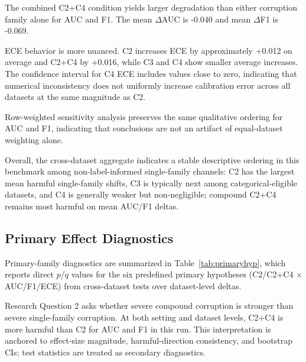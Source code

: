 \documentclass{AuthorGuide/ijitcs}
\newcommand{\fittableinput}[1]{%
\begingroup
\setlength{\tabcolsep}{4pt}%
\resizebox{\textwidth}{!}{}%
\endgroup
}
\begin{document}
The combined C2+C4 condition yields larger degradation than either corruption family alone for AUC and F1. The mean $\Delta$AUC is -0.040 and mean $\Delta$F1 is -0.069.

ECE behavior is more nuanced. C2 increases ECE by approximately +0.012 on average and C2+C4 by +0.016, while C3 and C4 show smaller average increases. The confidence interval for C4 ECE includes values close to zero, indicating that numerical inconsistency does not uniformly increase calibration error across all datasets at the same magnitude as C2.

Row-weighted sensitivity analysis preserves the same qualitative ordering for AUC and F1, indicating that conclusions are not an artifact of equal-dataset weighting alone.

Overall, the cross-dataset aggregate indicates a stable descriptive ordering in this benchmark among non-label-informed single-family channels: C2 has the largest mean harmful single-family shifts, C3 is typically next among categorical-eligible datasets, and C4 is generally weaker but non-negligible; compound C2+C4 remains most harmful on mean AUC/F1 deltas.

\begin{table}[!t]
\caption{Cross-dataset severe effects (0.4 minus 0.0), from \texttt{../results/tables/table\_cross\_dataset\_effects.csv}. Estimand: dataset-unweighted mean of dataset-level severe-minus-baseline deltas, where each dataset-level delta averages over model and encoding settings. Uncertainty: bootstrap 95\% CI over datasets. Eligibility: C1/C2/C4/C2+C4 use all 12 datasets; C3 uses categorical-eligible datasets only (\texttt{n\_cat\_cols > 0}, $n=10$). Harmful direction is $\Delta$AUC/$\Delta$F1 $< 0$ and $\Delta$ECE $> 0$.\label{tab:cross}}
\small
\fittableinput{../results/tables/table_cross_dataset_effects.tex}
\end{table}

\subsection{Primary Effect Diagnostics}
Primary-family diagnostics are summarized in Table~\ref{tab:primaryhyp}, which reports direct $p$/$q$ values for the six predefined primary hypotheses (C2/C2+C4 $\times$ AUC/F1/ECE) from cross-dataset tests over dataset-level deltas.

Research Question 2 asks whether severe compound corruption is stronger than severe single-family corruption. At both setting and dataset levels, C2+C4 is more harmful than C2 for AUC and F1 in this run. This interpretation is anchored to effect-size magnitude, harmful-direction consistency, and bootstrap CIs; test statistics are treated as secondary diagnostics.
\end{document}
